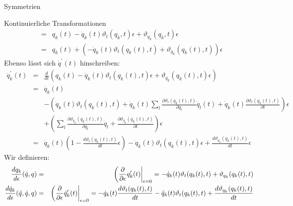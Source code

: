\documentclass[a4paper,fleqn]{article}
\numberwithin{equation}{section}
\begin{document}
\begin{section}{Symmetrien}
\begin{subsection}{Kontinuierliche Transformationen}
\begin{eqnarray*}
&=& q_k(t)-\dot{q}_k(t)\vartheta_t(q_k,t)\epsilon+\vartheta_{q_k}(q_k,t)\epsilon\\
&=& q_k(t)+\left(-\dot{q}_k(t)\vartheta_t(q_k(t),t)+\vartheta_{q_k}(q_k(t),t)\right)\epsilon
\end{eqnarray*}
Ebenso lässt sich $\dot{q}^\prime(t)$ hinschreiben:
\begin{eqnarray*}
\dot{q}_k^\prime(t) &=& \frac{d}{dt}\left(q_k(t)-\dot{q}_k(t)\vartheta_t(q_k(t),t)\epsilon+\vartheta_{q_k}(q_k(t),t)\epsilon\right)\\
&=& \dot{q}_k(t)\\
&&-\left(\ddot{q}_k(t)\vartheta_t(q_k(t),t)+\dot{q}_k(t)\sum_l\frac{\partial\vartheta_t(q_k(t),t)}{\partial q_l}\dot{q}_l(t)+\dot{q}_k(t)\frac{\partial\vartheta_t(q_k(t),t)}{\partial t}\right)\epsilon\\
&&+\left(\sum_l\frac{\partial\vartheta_{q_k}(q_k(t),t)}{\partial q_l}\dot{q}_l+\frac{\partial\vartheta_{q_k}(q_k(t),t)}{\partial t}\right)\epsilon\\
&=& \dot{q}_k(t)\left(1-\frac{d\vartheta_t(q_k(t),t)}{dt}\epsilon\right)-\ddot{q}_k(t)\vartheta_t(q_k(t),t)\epsilon
+\frac{d\vartheta_{q_k}(q_k(t),t)}{dt}\epsilon
\end{eqnarray*}
Wir definieren:
\begin{eqnarray}
\label{by_d_epsilon_def}
\frac{dq_k}{d\epsilon}(\dot{q},q) &=& \left(\frac{\partial}{\partial\epsilon}q^\prime_k(t)\right|_{\epsilon=0}
=-\dot{q}_k(t)\vartheta_t(q_k(t),t)+\vartheta_{q_k}(q_k(t),t)\cr
\frac{d\dot{q}_k}{d\epsilon}(\ddot{q},\dot{q},q) &=& \left(\frac{\partial}{\partial\epsilon}\dot{q}^\prime_k(t)\right|_{\epsilon=0}
=-\dot{q}_k(t)\frac{d\vartheta_t(q_k(t),t)}{dt}-\ddot{q}_k(t)\vartheta_t(q_k(t),t)
+\frac{d\vartheta_{q_k}(q_k(t),t)}{dt}
\end{eqnarray}
\end{subsection}


\end{section}
\end{document}
